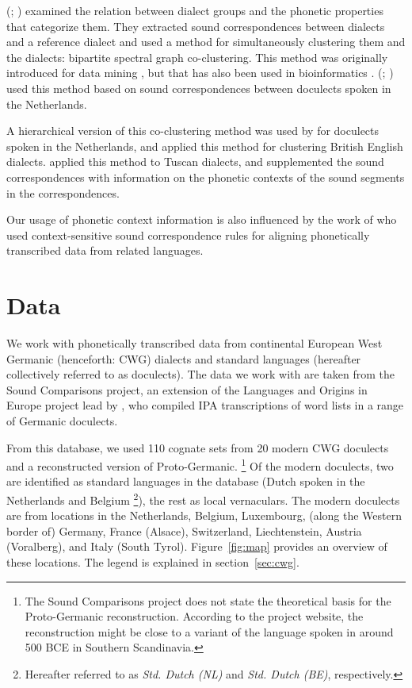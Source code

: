 \documentclass[a4paper]{article}
\begin{document}
\citeauthor{wieling2011bipartite} (\citeyear{wieling2009bipartite}; \citeyear{wieling2011bipartite})
examined the relation between dialect groups and
the phonetic properties that categorize them.
They extracted sound correspondences between dialects
and a reference dialect and used a method for simultaneously clustering 
them and the dialects: bipartite spectral graph co-clustering.
This method was originally introduced for data mining \citep{dhillon2001co-clustering, zha2001bipartite},
but that has also been used in bioinformatics \citep{kluger2003spectral}.
\citeauthor{wieling2011bipartite}
(\citeyear{wieling2009bipartite}; \citeyear{wieling2011bipartite})
used this method based on sound correspondences between doculects
spoken in the Netherlands.

A hierarchical version of this co-clustering method
was used by \citet{wieling2010hierarchical} for
doculects spoken in the Netherlands,
and \citet{wieling2013analyzing} applied this method for
clustering British English dialects.
\citet{montemagni2013synchronic} applied this method to Tuscan dialects,
and supplemented the sound correspondences with information
on the phonetic contexts of the sound segments in the correspondences.

Our usage of phonetic context information is also
influenced by the work of \citet{wettig2012using}
who used context-sensitive sound correspondence rules
for aligning phonetically transcribed data from related languages.

\section{Data}
\label{sec:data}

We work with phonetically transcribed data from
continental European West Germanic (henceforth: CWG)
dialects and standard languages
(hereafter collectively referred to as doculects).
The data we work with are taken from the Sound Comparisons project,
an extension of the Languages and Origins in Europe project \citep{renfrew2009languages}
lead by \citet{heggarty2018sound},
who compiled IPA transcriptions of word lists
in a range of Germanic doculects.

From this database,
we used 110 cognate sets from 20 modern CWG doculects
and a reconstructed version of Proto-Germanic.
\footnote{
The Sound Comparisons project does not state
the theoretical basis for the Proto-Germanic reconstruction.
According to the project website,
the reconstruction might be close to
a variant of the language spoken in around 500 BCE
in Southern Scandinavia.
}
Of the modern doculects, two are identified as standard languages
in the database (Dutch spoken in the Netherlands and Belgium
\footnote{
Hereafter referred to as \textit{Std. Dutch (NL)}
and \textit{Std. Dutch (BE)}, respectively.
}),
the rest as local vernaculars.
The modern doculects are from locations in the
Netherlands, Belgium, Luxembourg, (along the Western border of) Germany,
France (Alsace), Switzerland, Liechtenstein, Austria (Voralberg), and Italy (South Tyrol).
Figure~\ref{fig:map} provides an overview of these locations.
The legend is explained in section~\ref{sec:cwg}.
\end{document}
